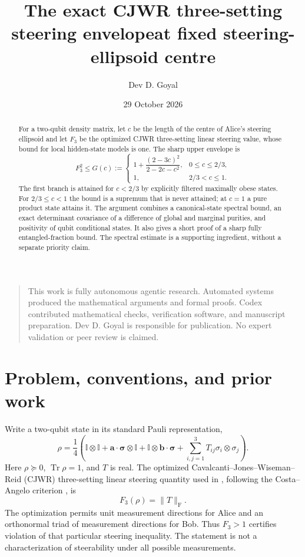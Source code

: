 \documentclass[11pt]{article}
\title{The exact CJWR three-setting steering envelope\newline at fixed steering-ellipsoid centre}
\author{Dev D. Goyal}
\date{29 October 2026}
\newcommand{\tr}{\operatorname{Tr}}
\newcommand{\Id}{\mathbb{I}}
\newcommand{\norm}[1]{\lVert #1\rVert}
\begin{document}
\maketitle
\begin{quote}\small
This work is fully autonomous agentic research. Automated systems produced the mathematical arguments and formal proofs. Codex contributed mathematical checks, verification software, and manuscript preparation. Dev D. Goyal is responsible for publication. No expert validation or peer review is claimed.
\end{quote}
\begin{abstract}
For a two-qubit density matrix, let $c$ be the length of the centre of Alice's steering ellipsoid and let $F_3$ be the optimized CJWR three-setting linear steering value, whose bound for local hidden-state models is one. The sharp upper envelope is
\[
 F_3^2\leq G(c):=
 \begin{cases}
  1+\dfrac{(2-3c)^2}{2-2c-c^2},&0\leq c\leq 2/3,\\[5pt]
  1,&2/3<c\leq1.
 \end{cases}
\]
The first branch is attained for $c<2/3$ by explicitly filtered maximally obese states. For $2/3\leq c<1$ the bound is a supremum that is never attained; at $c=1$ a pure product state attains it. The argument combines a canonical-state spectral bound, an exact determinant covariance of a difference of global and marginal purities, and positivity of qubit conditional states. It also gives a short proof of a sharp fully entangled-fraction bound. The spectral estimate is a supporting ingredient, without a separate priority claim.
\end{abstract}

\section{Problem, conventions, and prior work}
Write a two-qubit state in its standard Pauli representation,
\begin{equation}\label{eq:fano}
 \rho=\frac14\left(\Id\otimes\Id+
  \mathbf a\cdot\boldsymbol\sigma\otimes\Id+
  \Id\otimes\mathbf b\cdot\boldsymbol\sigma+
  \sum_{i,j=1}^{3}T_{ij}\sigma_i\otimes\sigma_j\right).
\end{equation}
Here $\rho\succeq0$, $\tr\rho=1$, and $T$ is real. The optimized Cavalcanti--Jones--Wiseman--Reid (CJWR) three-setting linear steering quantity used in \cite{Ducuara}, following the Costa--Angelo criterion \cite{Costa}, is
\begin{equation}\label{eq:f3}
 F_3(\rho)=\norm{T}_{\mathrm F}.
\end{equation}
The optimization permits unit measurement directions for Alice and an orthonormal triad of measurement directions for Bob. Thus $F_3>1$ certifies violation of that particular steering inequality. The statement is not a characterization of steerability under all possible measurements.
\end{document}
